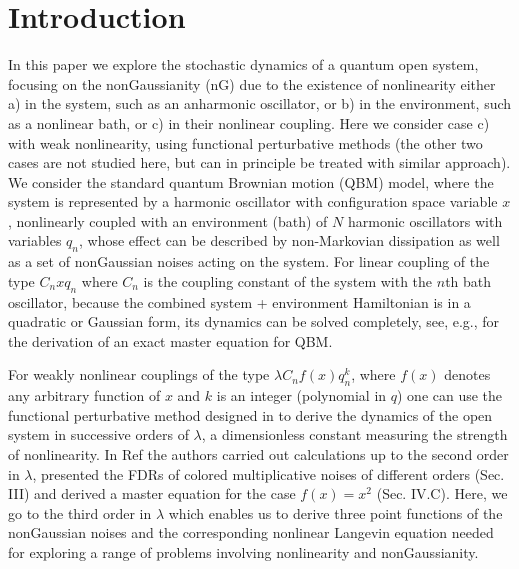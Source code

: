 \documentclass[%
amssymb,preprint,preprintnumbers,nofootinbib,superscriptaddress]{revtex4}
\begin{document}
\section{Introduction}\label{sec:intro}

In this paper we explore the stochastic dynamics of a quantum open system, focusing on the nonGaussianity (nG) due to the existence of nonlinearity either a) in the system, such as an anharmonic oscillator, or b) in the environment, such as a nonlinear bath, or c) in their nonlinear coupling. Here we consider case c) with weak nonlinearity,   using functional perturbative methods (the other two cases are not studied here, but can in principle be treated with similar approach).  We consider the standard quantum Brownian motion (QBM) model, where the system is represented by a harmonic oscillator with configuration space variable $x$, nonlinearly coupled with an environment (bath) of $N$ harmonic oscillators with variables $q_n$, whose effect can be described by  {non-Markovian dissipation as well as} a set of nonGaussian noises acting on the system. For linear coupling of the type ${C_n x q_n}$ where $C_n$ is the coupling constant of the system with the $n$th bath oscillator, because the combined system + environment Hamiltonian is in a quadratic or Gaussian form, its dynamics can be solved completely, see, e.g.,\cite{HPZ92} for the derivation of an exact master equation for QBM. 

\vskip 10pt

For weakly nonlinear couplings of the type $\lambda C_n f(x)q_n^k$, where $f(x)$ denotes any arbitrary function of $x$ and $k$ is an integer (polynomial in $q$) one can use the functional perturbative method designed in \cite{HPZ93} to derive the dynamics of the open system in successive orders of $\lambda$, a dimensionless constant measuring the strength of nonlinearity. In Ref \cite{HPZ93} the authors carried out calculations up to the second order in $\lambda$, presented the FDRs of colored multiplicative noises of different orders (Sec. III) and derived a master equation for the case $f(x)= x^2$ (Sec. IV.C).   Here, we go to the third order in $\lambda$ which enables us to derive three point functions of the nonGaussian noises and   the corresponding nonlinear Langevin equation    needed for exploring a range of problems involving nonlinearity and nonGaussianity.   
\end{document}
